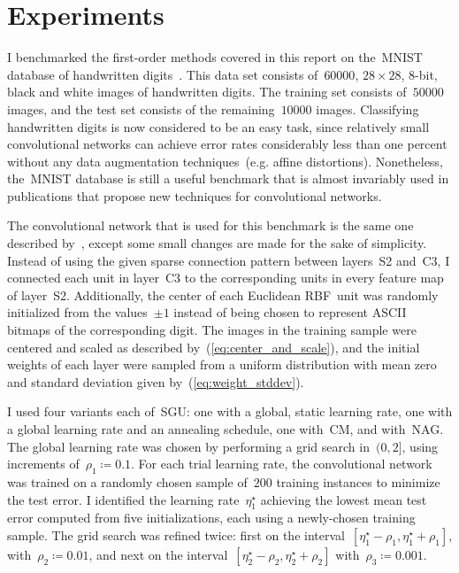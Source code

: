 \documentclass[11pt,a4paper]{article}
\numberwithin{equation}{section}
\begin{document}
\section{Experiments}

I benchmarked the first-order methods covered in this report on the~MNIST
database of handwritten digits~\citep{lecun-98}. This data set consists
of~$\num{60000}$, $28 \times 28$, 8-bit, black and white images of handwritten
digits. The training set consists of~$\num{50000}$ images, and the test set
consists of the remaining~$\num{10000}$ images. Classifying handwritten digits
is now considered to be an easy task, since relatively small convolutional
networks can achieve error rates considerably less than one percent without any
data augmentation techniques~(e.g. affine distortions). Nonetheless, the~MNIST
database is still a useful benchmark that is almost invariably used in
publications that propose new techniques for convolutional networks.

The convolutional network that is used for this benchmark is the same one
described by~\citet{lecun-98}, except some small changes are made for the sake
of simplicity. Instead of using the given sparse connection pattern between
layers~S2 and~C3, I connected each unit in layer~C3 to the corresponding units
in every feature map of layer~S2. Additionally, the center of each Euclidean
RBF~unit was randomly initialized from the values~$\pm 1$ instead of being
chosen to represent ASCII bitmaps of the corresponding digit. The images in the
training sample were centered and scaled as described
by~(\ref{eq:center_and_scale}), and the initial weights of each layer were
sampled from a uniform distribution with mean zero and standard deviation given
by~(\ref{eq:weight_stddev}).

I used four variants each of~SGU: one with a global, static learning rate, one
with a global learning rate and an annealing schedule, one with~CM, and
with~NAG. The global learning rate was chosen by performing a grid search
in~$(0, 2]$, using increments of~$\rho_1 \coloneqq 0.1$. For each trial learning
rate, the convolutional network was trained on a randomly chosen sample of~$200$
training instances to minimize the test error. I identified the learning
rate~$\eta_1^\star$ achieving the lowest mean test error computed from five
initializations, each using a newly-chosen training sample. The grid search was
refined twice: first on the interval~$[\eta_1^\star - \rho_1, \eta_1^\star +
\rho_1]$, with~$\rho_2 \coloneqq 0.01$, and next on the interval~$[\eta_2^\star
- \rho_2, \eta_2^\star + \rho_2]$ with~$\rho_3 \coloneqq 0.001$.
\end{document}
